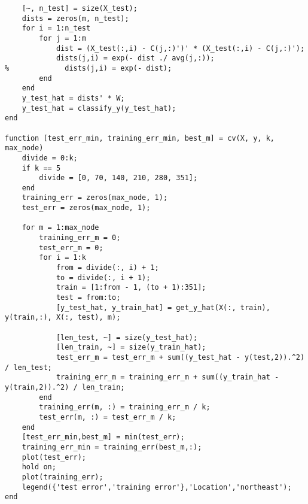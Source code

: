 \documentclass[12pt]{article}
\begin{document}
\begin{verbatim}
    [~, n_test] = size(X_test);
    dists = zeros(m, n_test);
    for i = 1:n_test
        for j = 1:m
            dist = (X_test(:,i) - C(j,:)')' * (X_test(:,i) - C(j,:)');
            dists(j,i) = exp(- dist ./ avg(j,:));
%             dists(j,i) = exp(- dist);
        end
    end
    y_test_hat = dists' * W;
    y_test_hat = classify_y(y_test_hat);
end

function [test_err_min, training_err_min, best_m] = cv(X, y, k, max_node)
    divide = 0:k;
    if k == 5
        divide = [0, 70, 140, 210, 280, 351];
    end
    training_err = zeros(max_node, 1);
    test_err = zeros(max_node, 1);
    
    for m = 1:max_node
        training_err_m = 0;
        test_err_m = 0;
        for i = 1:k
            from = divide(:, i) + 1;
            to = divide(:, i + 1);
            train = [1:from - 1, (to + 1):351];
            test = from:to;
            [y_test_hat, y_train_hat] = get_y_hat(X(:, train), y(train,:), X(:, test), m);

            [len_test, ~] = size(y_test_hat);
            [len_train, ~] = size(y_train_hat);
            test_err_m = test_err_m + sum((y_test_hat - y(test,2)).^2) / len_test;
            training_err_m = training_err_m + sum((y_train_hat - y(train,2)).^2) / len_train;
        end
        training_err(m, :) = training_err_m / k;
        test_err(m, :) = test_err_m / k;
    end
    [test_err_min,best_m] = min(test_err);
    training_err_min = training_err(best_m,:);
    plot(test_err);
    hold on;
    plot(training_err);
    legend({'test error','training error'},'Location','northeast');
end
    
    
    
\end{verbatim}
\end{document}

